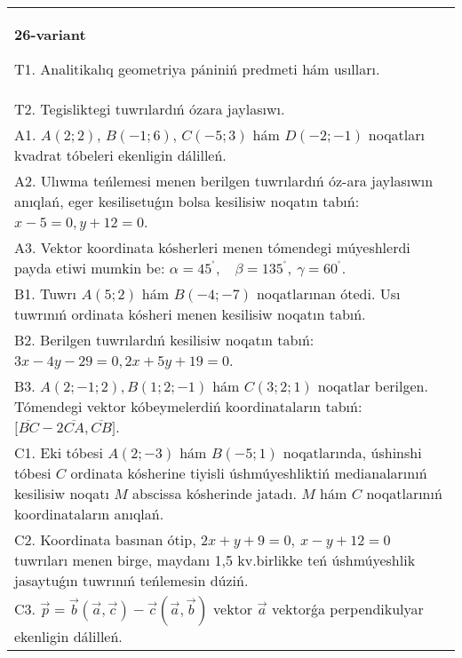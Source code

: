 \documentclass{article}
\begin{document}
\begin{tabular}{m{17cm}}
\textbf{26-variant}
\newline

T1. Analitikalıq geometriya pániniń predmeti hám usılları. 
 \\
T2. 
Tegisliktegi tuwrılardıń ózara jaylasıwı.
 \\
A1. 
$A(2;2)$, $B(-1;6)$, $C(-5;3)$ hám $D(-2;-1)$
noqatları kvadrat tóbeleri ekenligin dálilleń.
 \\
A2. 
Ulıwma teńlemesi menen berilgen tuwrılardıń
óz-ara jaylasıwın anıqlań, eger kesilisetuǵın bolsa kesilisiw noqatın
tabıń: $x-5=0, y+12=0$.
 \\
A3. 
Vektor koordinata kósherleri menen tómendegi múyeshlerdi payda etiwi mumkin be:
$\alpha = 45^{{^\circ}},\ \ \ \ \beta = 135^{{^\circ}},\ \gamma = 60^{{^\circ}}$.
 \\
B1. 
Tuwrı \(A(5;2)\) hám \(B( -4; -7)\) noqatlarınan ótedi.
Usı tuwrınıń ordinata kósheri menen kesilisiw noqatın tabıń.
 \\
B2. Berilgen tuwrılardıń kesilisiw noqatın tabıń: 
\(3x-4y-29=0, 2x+5y+19=0\).
 \\
B3. 
$A (2; -1;2),B (1;2; - 1) $ hám $C (3;2;1) $ noqatlar berilgen. Tómendegi vektor kóbeymelerdiń koordinataların tabıń: 
$\lbrack\overline{BC} - 2\overline{CA},\overline{CB}\rbrack$.
 \\
C1. 
Eki tóbesi \(A(2; - 3)\) hám \(B( - 5;1)\) noqatlarında,
úshinshi tóbesi $C$ ordinata kósherine tiyisli úshmúyeshliktiń
medianalarınıń kesilisiw noqatı $M$ abscissa kósherinde jatadı.
$M$ hám $C$ noqatlarınıń koordinataların anıqlań.
 \\
C2. 
Koordinata basınan ótip,
\(2x + y + 9 = 0,\ x - y + 12 = 0\) tuwrıları menen birge, maydanı
1,5 kv.birlikke teń úshmúyeshlik jasaytuǵın tuwrınıń teńlemesin dúziń.
 \\
C3. 
\(\vec{p} = \vec{b} (\vec{a},\vec{c}) - \vec{c}(\vec{a},\vec{b})\) vektor \(\vec{a}\) vektorǵa perpendikulyar ekenligin dálilleń.
 \\

\end{tabular}
\vspace{1cm}
\end{document}
